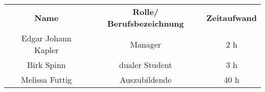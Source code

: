 \begin{tabular}{|c|c|c|}
    \rowcolor{heading}\textbf{Name} & \textbf{Rolle/ Berufsbezeichnung} & \textbf{Zeitaufwand} \\
    \rowcolor{odd}Edgar Johann Kapler & Manager &  2 h \\
    Birk Spinn & dualer Student & 3 h \\
    \rowcolor{odd}Melissa Futtig & Auszubildende & 40 h \\
    \hline
\end{tabular}
